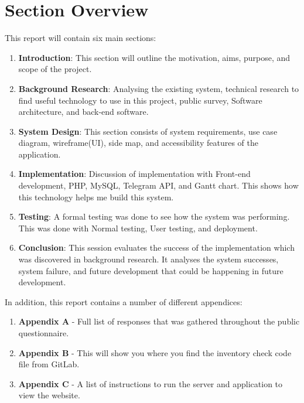 \section{Section Overview}
This report will contain six main sections:
\begin{enumerate}
    \item \textbf{Introduction}: This section will outline the motivation, aims, purpose, and scope of the project.
    
    \item \textbf{Background Research}: Analysing the existing system, technical research to find useful technology to use in this project, public survey, Software architecture, and back-end software.
    
    \item \textbf{System Design}: This section consists of system requirements, use case diagram, wireframe(UI), side map, and accessibility features of the application.
    
    \item \textbf{Implementation}: Discussion of implementation with Front-end development, PHP, MySQL, Telegram API, and Gantt chart. This shows how this technology helps me build this system.
    
    \item \textbf{Testing}: A formal testing was done to see how the system was performing. This was done with Normal testing, User testing, and deployment.
    
    \item \textbf{Conclusion}: This session evaluates the success of the implementation which was discovered in background research. It analyses the system successes, system failure, and future development that could be happening in future development.

    
\end{enumerate}

In addition, this report contains a number of different appendices:
\begin{enumerate}
    \item \textbf{Appendix A} - Full list of responses that was gathered throughout the public questionnaire.
    \item \textbf{Appendix B} - This will show you where you find the inventory check code file from GitLab.
    \item \textbf{Appendix C} - A list of instructions to run the server and application to view the website.
\end{enumerate}
